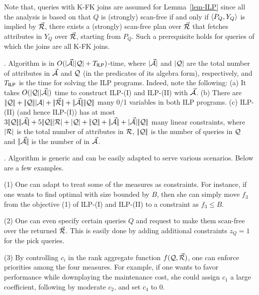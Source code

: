 {Note that, \SPC queries with K-FK joins are assumed for
Lemma~\ref{lem-ILP} since all the analysis is based on that $Q$ is
(strongly) scan-free if and only if $\langle P_{Q},\allowbreak Y_{Q}\rangle$ is
implied by $\vec{{\mathcal R}}$, \ie there exists a (strongly) scan-free
plan over $\vec{{\mathcal R}}$ that fetches attributes in $Y_{Q}$ over
$\vec{{\mathcal R}}$, starting from $P_{Q}$. Such a prerequisite holds for
\SPC queries of which the joins are all K-FK joins. 


. Algorithm \opts is in
$O(|{\vec{{\mathcal A}}}||{\mathcal Q}| + T_{\protect\mathsf{ILP}} )$-time, where
$|{\vec{{\mathcal A}}}|$ and $|{\mathcal Q}|$ are the total number of attributes
in $\vec{{\mathcal A}}$ and $\mathcal Q$ (in the predicates of its algebra form),
respectively, and $T_{\protect\mathsf{ILP}}$ is the time for solving the ILP programs. 
Indeed, note the following:
(a) It takes $O(|{\mathcal Q}||{\vec{{\mathcal A}}}|)$ time to construct ILP-(I) and
ILP-(II) with $\vec{{\mathcal A}}$.
(b) There are $\cdd{\Q} + \cdd{\Q}\cd{\A} + \cdd{\kb{\R}} + \cdd{\kb{\A}}\cdd{\Q}$ many 0/1
variables in both ILP programs.
(c) ILP-(II) (and hence ILP-(I)) has at most
$3\cdd{\Q}\cdd{\kb{\A}} + 5\cdd{\Q}\cd{\R} + \cd{\Q} +
\cdd{\Q} + \cdd{\kb{\A}} + \cd{\kb{\A}}\cdd{\Q}$ many linear
constraints, where $|{{\mathcal R}}|$ is the total number of attributes in
${\mathcal R}$, $|\!|{\mathcal Q}|\!|$ is the number of queries in $\mathcal Q$ and
$|\!|{\vec{{\mathcal A}}}|\!|$ is the number of \bss in $\vec{{\mathcal A}}$. 



. Algorithm \opts is generic and can be easily
adapted to serve various scenarios. Below are a few examples.

\sstab (1) One can adapt \opts to treat some of the measures as
constraints. For instance, if one wants to find optimal \bds
with size bounded by $B$, then she can simply move $f_{3}$ from
the objective (1) of ILP-(I) and ILP-(II) to a constraint as
$f_{3}\leq B$.

\sstab (2) One can even specify certain queries $Q$ and request
to make them scan-free over the returned \bds $\vec{{\mathcal R}}$. This is
easily done by adding additional constraints $z_{Q} = 1$
for the pick queries.

\sstab (3) By controlling $c_{i}$ in the rank aggregate function
$f(\mathcal Q, \vec{{\mathcal R}})$, one can enforce priorities among the four
measures. For example, if one wants to favor performance while
downplaying the maintenance cost, she could assign $c_{1}$ a
large coefficient, following by moderate $c_{2}$, and set $c_{4}$
to 0.
}%

